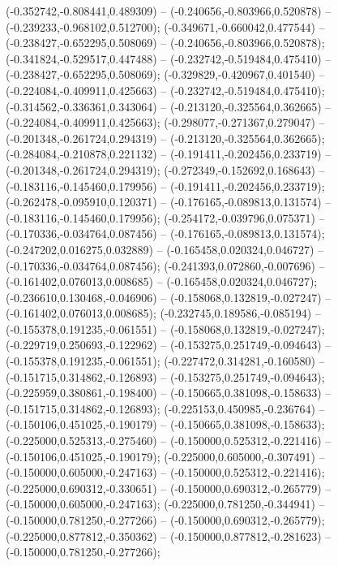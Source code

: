  (-0.352742,-0.808441,0.489309) -- (-0.240656,-0.803966,0.520878) -- (-0.239233,-0.968102,0.512700);
 (-0.349671,-0.660042,0.477544) -- (-0.238427,-0.652295,0.508069) -- (-0.240656,-0.803966,0.520878);
 (-0.341824,-0.529517,0.447488) -- (-0.232742,-0.519484,0.475410) -- (-0.238427,-0.652295,0.508069);
 (-0.329829,-0.420967,0.401540) -- (-0.224084,-0.409911,0.425663) -- (-0.232742,-0.519484,0.475410);
 (-0.314562,-0.336361,0.343064) -- (-0.213120,-0.325564,0.362665) -- (-0.224084,-0.409911,0.425663);
 (-0.298077,-0.271367,0.279047) -- (-0.201348,-0.261724,0.294319) -- (-0.213120,-0.325564,0.362665);
 (-0.284084,-0.210878,0.221132) -- (-0.191411,-0.202456,0.233719) -- (-0.201348,-0.261724,0.294319);
 (-0.272349,-0.152692,0.168643) -- (-0.183116,-0.145460,0.179956) -- (-0.191411,-0.202456,0.233719);
 (-0.262478,-0.095910,0.120371) -- (-0.176165,-0.089813,0.131574) -- (-0.183116,-0.145460,0.179956);
 (-0.254172,-0.039796,0.075371) -- (-0.170336,-0.034764,0.087456) -- (-0.176165,-0.089813,0.131574);
 (-0.247202,0.016275,0.032889) -- (-0.165458,0.020324,0.046727) -- (-0.170336,-0.034764,0.087456);
 (-0.241393,0.072860,-0.007696) -- (-0.161402,0.076013,0.008685) -- (-0.165458,0.020324,0.046727);
 (-0.236610,0.130468,-0.046906) -- (-0.158068,0.132819,-0.027247) -- (-0.161402,0.076013,0.008685);
 (-0.232745,0.189586,-0.085194) -- (-0.155378,0.191235,-0.061551) -- (-0.158068,0.132819,-0.027247);
 (-0.229719,0.250693,-0.122962) -- (-0.153275,0.251749,-0.094643) -- (-0.155378,0.191235,-0.061551);
 (-0.227472,0.314281,-0.160580) -- (-0.151715,0.314862,-0.126893) -- (-0.153275,0.251749,-0.094643);
 (-0.225959,0.380861,-0.198400) -- (-0.150665,0.381098,-0.158633) -- (-0.151715,0.314862,-0.126893);
 (-0.225153,0.450985,-0.236764) -- (-0.150106,0.451025,-0.190179) -- (-0.150665,0.381098,-0.158633);
 (-0.225000,0.525313,-0.275460) -- (-0.150000,0.525312,-0.221416) -- (-0.150106,0.451025,-0.190179);
 (-0.225000,0.605000,-0.307491) -- (-0.150000,0.605000,-0.247163) -- (-0.150000,0.525312,-0.221416);
 (-0.225000,0.690312,-0.330651) -- (-0.150000,0.690312,-0.265779) -- (-0.150000,0.605000,-0.247163);
 (-0.225000,0.781250,-0.344941) -- (-0.150000,0.781250,-0.277266) -- (-0.150000,0.690312,-0.265779);
 (-0.225000,0.877812,-0.350362) -- (-0.150000,0.877812,-0.281623) -- (-0.150000,0.781250,-0.277266);
